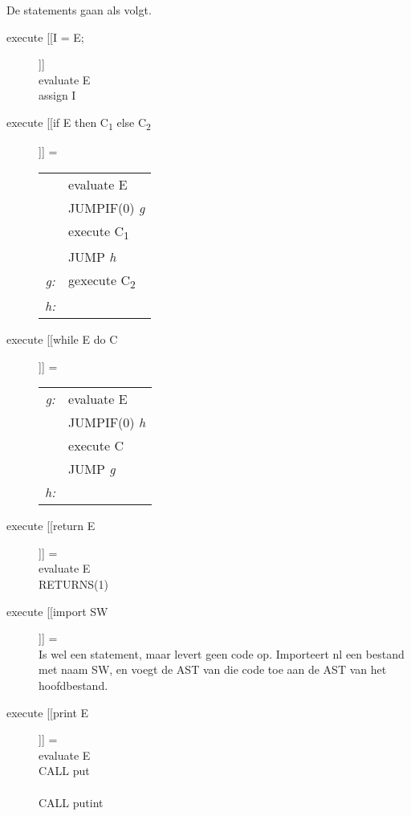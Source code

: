 De statements gaan als volgt.
\begin{description}
    \item[execute [[I = E;]]] \hfill \\
        evaluate E \\
        assign I
    \item[execute [[if E then C\textsubscript{1} else C\textsubscript{2}]]] = \hfill \\
        \begin{tabular}{c l}
            &evaluate E \\
            &JUMPIF(0) \emph{g} \\
            &execute C\textsubscript{1} \\
            &JUMP \emph{h} \\
    \emph{g:}&gexecute C\textsubscript{2} \\
    \emph{h:}& \\
        \end{tabular}
    \item[execute [[while E do C]]] = \hfill \\
        \begin{tabular}{c l}
    \emph{g:}&evaluate E \\
            &JUMPIF(0) \emph{h} \\
            &execute C \\
            &JUMP \emph{g} \\
    \emph{h:}
        \end{tabular} 
    \item[execute [[return E]]]  = \hfill \\
        evaluate E \\
        RETURNS(1)
    \item[execute [[import SW]]] = \hfill \\ 
        Is wel een statement, maar levert geen code op. Importeert nl een bestand met naam SW, en voegt de AST van die code toe aan de AST van het hoofdbestand.
    \item[execute [[print E]]] = \hfill \\
        evaluate E \\
        CALL put \\
         \\
        CALL putint
\end{description}

